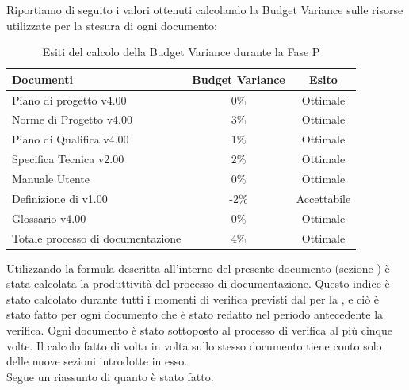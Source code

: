 Riportiamo di seguito i valori ottenuti calcolando la Budget Variance sulle risorse utilizzate per la stesura di ogni documento:
			\begin{table}[H]
					\centering
					\begin{tabu}{| l | c | c |}
							\hline
							Documenti 							& Budget Variance	& Esito		\\ \hline \hline
							
							Piano di progetto v4.00				& 0\% 		& Ottimale  \\ \hline
							Norme di Progetto v4.00 			& 3\%		& Ottimale  \\ \hline
							Piano di Qualifica v4.00 			& 1\%		& Ottimale  \\ \hline
							Specifica Tecnica v2.00 			& 2\%		& Ottimale  \\ \hline
							Manuale Utente  			& 0\%		& Ottimale  \\ \hline
							Definizione di  v1.00 			& -2\%		& Accettabile  \\ \hline
							Glossario v4.00					 	& 0\% 		& Ottimale  \\ \hline
							Totale processo di documentazione & 4\% & Ottimale \\ \hline
						\end{tabu}
					\caption{Esiti del calcolo della Budget Variance durante la Fase P}
				\end{table}
Utilizzando la formula descritta all'interno del presente documento (sezione ) è stata calcolata la produttività del processo di documentazione. Questo indice è stato calcolato durante tutti i momenti di verifica previsti dal  per la , e ciò è stato fatto per ogni documento che è stato redatto nel periodo antecedente la verifica. Ogni documento è stato sottoposto al processo di verifica al più cinque volte. Il calcolo fatto di volta in volta sullo stesso documento tiene conto solo delle nuove sezioni introdotte in esso.\\
Segue un riassunto di quanto è stato fatto.
